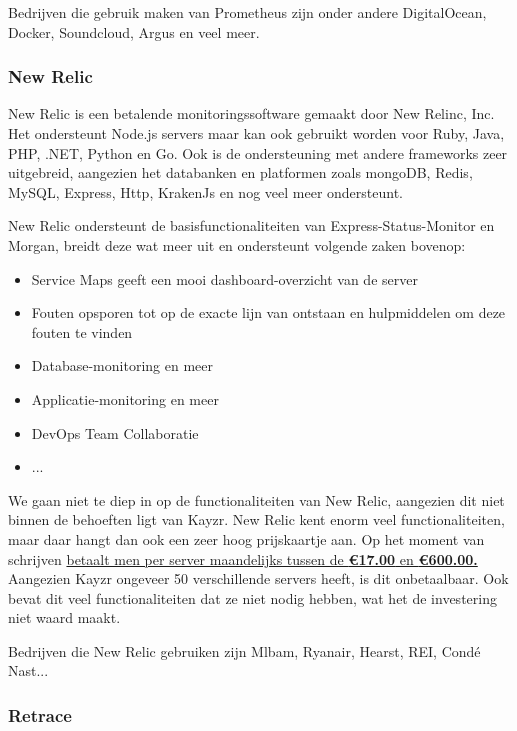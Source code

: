 Bedrijven die gebruik maken van Prometheus zijn onder andere DigitalOcean, Docker, Soundcloud, Argus en veel meer.

\subsubsection{New Relic}
\label{sec:newRelic}

New Relic is een betalende monitoringssoftware gemaakt door New Relinc, Inc. Het ondersteunt Node.js servers maar kan ook gebruikt worden voor Ruby, Java, PHP, .NET, Python en Go. Ook is de ondersteuning met andere frameworks zeer uitgebreid, aangezien het databanken en platformen zoals mongoDB, Redis, MySQL, Express, Http, KrakenJs en nog veel meer ondersteunt. 

New Relic ondersteunt de basisfunctionaliteiten van Express-Status-Monitor en Morgan, breidt deze wat meer uit en ondersteunt volgende zaken bovenop:

\begin{itemize}
	\item Service Maps geeft een mooi dashboard-overzicht van de server
	\item Fouten opsporen tot op de exacte lijn van ontstaan en hulpmiddelen om deze fouten te vinden
	\item Database-monitoring en meer
	\item Applicatie-monitoring en meer
	\item DevOps Team Collaboratie
	\item ...
\end{itemize}

We gaan niet te diep in op de functionaliteiten van New Relic, aangezien dit niet binnen de behoeften ligt van Kayzr. New Relic kent enorm veel functionaliteiten, maar daar hangt dan ook een zeer hoog prijskaartje aan. Op het moment van schrijven \href{https://newrelic.com/products/browser-monitoring/pricing}{betaalt men per server maandelijks tussen de \textbf{\euro17.00} en \textbf{\euro600.00.}}  Aangezien Kayzr ongeveer 50 verschillende servers heeft, is dit onbetaalbaar. Ook bevat dit veel functionaliteiten dat ze niet nodig hebben, wat het de investering niet waard maakt.

Bedrijven die New Relic gebruiken zijn Mlbam, Ryanair, Hearst, REI, Condé Nast...

\subsubsection{Retrace}
\label{sec:retrace}

